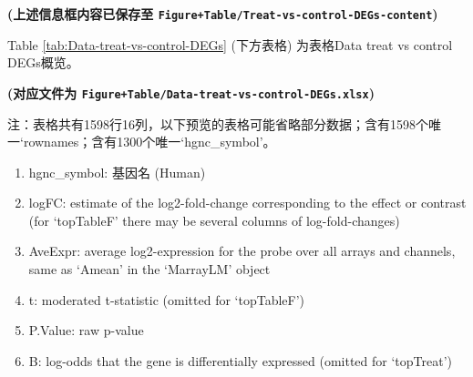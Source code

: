 \documentclass[
]{article}
\providecommand{\tightlist}{%
  \setlength{\itemsep}{0pt}\setlength{\parskip}{0pt}}
\begin{document}
\textbf{(上述信息框内容已保存至 \texttt{Figure+Table/Treat-vs-control-DEGs-content})}

Table \ref{tab:Data-treat-vs-control-DEGs} (下方表格) 为表格Data treat vs control DEGs概览。

\textbf{(对应文件为 \texttt{Figure+Table/Data-treat-vs-control-DEGs.xlsx})}

\begin{center}\begin{tcolorbox}[colback=gray!10, colframe=gray!50, width=0.9\linewidth, arc=1mm, boxrule=0.5pt]注：表格共有1598行16列，以下预览的表格可能省略部分数据；含有1598个唯一`rownames；含有1300个唯一`hgnc\_symbol'。
\end{tcolorbox}
\end{center}
\begin{center}\begin{tcolorbox}[colback=gray!10, colframe=gray!50, width=0.9\linewidth, arc=1mm, boxrule=0.5pt]\begin{enumerate}\tightlist
\item hgnc\_symbol:  基因名 (Human)
\item logFC:  estimate of the log2-fold-change corresponding to the effect or contrast (for ‘topTableF’ there may be several columns of log-fold-changes)
\item AveExpr:  average log2-expression for the probe over all arrays and channels, same as ‘Amean’ in the ‘MarrayLM’ object
\item t:  moderated t-statistic (omitted for ‘topTableF’)
\item P.Value:  raw p-value
\item B:  log-odds that the gene is differentially expressed (omitted for ‘topTreat’)
\end{enumerate}\end{tcolorbox}
\end{center}
\end{document}
